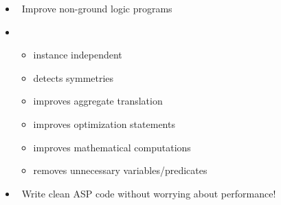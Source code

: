 \begin{frame}{\ngo}
  \begin{itemize}
  \item {} \ Improve non-ground logic programs
  \item {} \
    \begin{itemize}
    \item instance independent
    \item detects symmetries
    \item improves aggregate translation
    \item improves optimization statements
    \item improves mathematical computations
    \item removes unnecessary variables/predicates
    \end{itemize}
  \item {} \ Write clean ASP code without worrying about performance!
  \end{itemize}
\end{frame}
%
